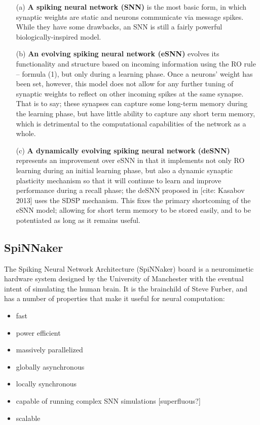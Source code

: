 \documentclass[journal]{./sty/IEEEtran}
\begin{document}
\begin{itemize}
\item[(a)] {\bf A spiking neural network (SNN)} is the most basic form, in which synaptic weights are static and neurons communicate via message spikes.
While they have some drawbacks, an SNN is still a fairly powerful biologically-inspired model.
\item[(b)] {\bf An evolving spiking neural network (eSNN)} evolves its functionality and structure based on incoming information using the RO rule -- formula (1), but only during a learning phase.
Once a neurons' weight has been set, however, this model does not allow for any further tuning of synaptic weights to reflect on other incoming spikes at the same synapse. 
That is to say; these synapses can capture some long-term memory during the learning phase, but have little ability to capture any short term memory, which is detrimental to the computational capabilities of the network as a whole. 
\item[(c)] {\bf A dynamically evolving spiking neural network (deSNN)} represents an improvement over eSNN in that it implements not only RO learning during an initial learning phase, but also a dynamic synaptic plasticity mechanism so that it will continue to learn and improve performance during a recall phase; the deSNN proposed in [cite: Kasabov 2013] uses the SDSP mechanism.
This fixes the primary shortcoming of the eSNN model; allowing for short term memory to be stored easily, and to be potentiated as long as it remains useful. 
\end{itemize}

\subsection{SpiNNaker}
The Spiking Neural Network Architecture (SpiNNaker) board is a neuromimetic hardware system designed by the University of Manchester with the eventual intent of simulating the human brain. 
It is the brainchild of Steve Furber, and has a number of properties that make it useful for neural computation:
\begin{itemize}
\item fast
\item power efficient
\item massively parallelized
\item globally asynchronous
\item locally synchronous 
\item capable of running complex SNN simulations [superfluous?]
\item scalable
\end{itemize}
\end{document}
